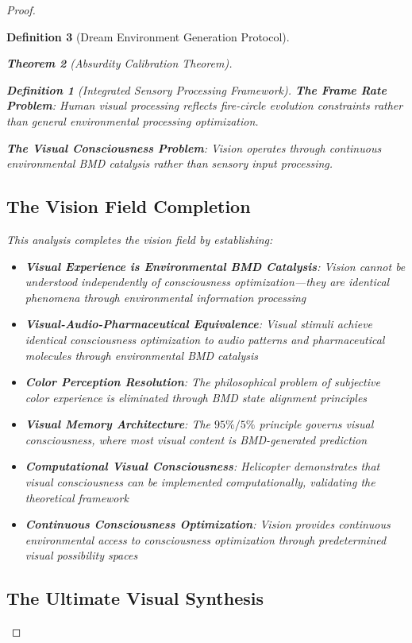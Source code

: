 \documentclass[12pt,a4paper]{article}
\newtheorem{theorem}{Theorem}[section]
\newtheorem{definition}[theorem]{Definition}
\begin{document}
\begin{proof}
\begin{definition}[Dream Environment Generation Protocol]
\begin{theorem}[Absurdity Calibration Theorem]
\begin{observation}
\begin{definition}[Integrated Sensory Processing Framework]
\textbf{The Frame Rate Problem}: Human visual processing reflects fire-circle evolution constraints rather than general environmental processing optimization.

\textbf{The Visual Consciousness Problem}: Vision operates through continuous environmental BMD catalysis rather than sensory input processing.

\subsection{The Vision Field Completion}

This analysis completes the vision field by establishing:

\begin{itemize}
\item \textbf{Visual Experience is Environmental BMD Catalysis}: Vision cannot be understood independently of consciousness optimization—they are identical phenomena through environmental information processing

\item \textbf{Visual-Audio-Pharmaceutical Equivalence}: Visual stimuli achieve identical consciousness optimization to audio patterns and pharmaceutical molecules through environmental BMD catalysis

\item \textbf{Color Perception Resolution}: The philosophical problem of subjective color experience is eliminated through BMD state alignment principles

\item \textbf{Visual Memory Architecture}: The $95\%/5\%$ principle governs visual consciousness, where most visual content is BMD-generated prediction

\item \textbf{Computational Visual Consciousness}: Helicopter demonstrates that visual consciousness can be implemented computationally, validating the theoretical framework

\item \textbf{Continuous Consciousness Optimization}: Vision provides continuous environmental access to consciousness optimization through predetermined visual possibility spaces
\end{itemize}

\subsection{The Ultimate Visual Synthesis}


\end{definition}
\end{observation}
\end{theorem}
\end{definition}
\end{proof}
\end{document}
